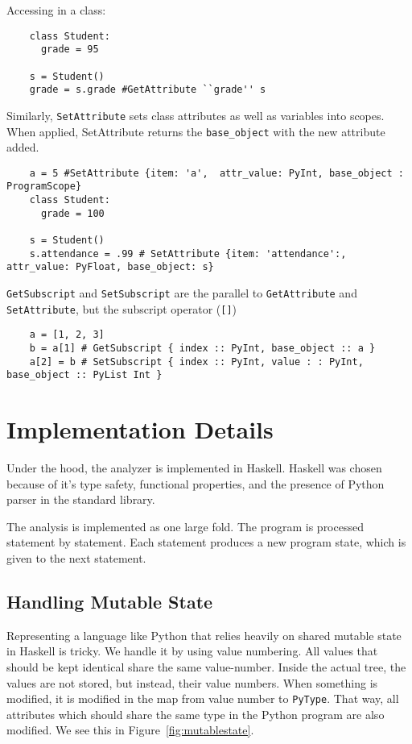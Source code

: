 \documentclass{article}[12pt]
\begin{document}
Accessing in a class:
\begin{verbatim}
    class Student:
      grade = 95

    s = Student()
    grade = s.grade #GetAttribute ``grade'' s
\end{verbatim}

Similarly, \verb=SetAttribute= sets class attributes as well as variables into scopes. When applied,
SetAttribute returns the \verb=base_object= with the new attribute added.

\begin{verbatim}
    a = 5 #SetAttribute {item: 'a',  attr_value: PyInt, base_object : ProgramScope}
    class Student:
      grade = 100

    s = Student()
    s.attendance = .99 # SetAttribute {item: 'attendance':, attr_value: PyFloat, base_object: s}
\end{verbatim}

\verb=GetSubscript= and \verb=SetSubscript= are the parallel to \verb=GetAttribute= and
\verb=SetAttribute=, but the subscript operator (\verb=[]=)

\begin{verbatim}
    a = [1, 2, 3]
    b = a[1] # GetSubscript { index :: PyInt, base_object :: a }
    a[2] = b # SetSubscript { index :: PyInt, value : : PyInt, base_object :: PyList Int }
\end{verbatim}

\section{Implementation Details}

Under the hood, the analyzer is implemented in Haskell. Haskell was chosen because of it's type
safety, functional properties, and the presence of Python parser in the standard library. 

The analysis is implemented as one large fold. The program is processed statement by statement. Each
statement produces a new program state, which is given to the next statement.

\subsection{Handling Mutable State}
Representing a language like Python that relies heavily on shared mutable state in Haskell is
tricky. We handle it by using value numbering. All values that should be kept identical share the
same value-number. Inside the actual tree, the values are not stored, but instead, their value
numbers. When something is modified, it is modified in the map from value number to \verb=PyType=.
That way, all attributes which should share the same type in the Python program are also modified.
We see this in Figure~\ref{fig:mutablestate}.
\end{document}
